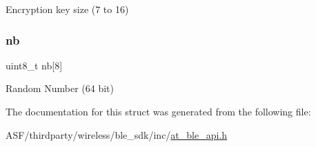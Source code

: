 Encryption key size (7 to 16) 

\mbox{\label{structat__ble___l_t_k__t_a3199b838db07457933ad33b42b04de39}} 
\subsubsection{\texorpdfstring{nb}{nb}}
{\footnotesize\ttfamily uint8\+\_\+t nb\mbox{[}8\mbox{]}}



Random Number (64 bit) 



The documentation for this struct was generated from the following file\+:\begin{DoxyCompactItemize}
\item 
A\+S\+F/thirdparty/wireless/ble\+\_\+sdk/inc/\mbox{\hyperlink{at__ble__api_8h}{at\+\_\+ble\+\_\+api.\+h}}\end{DoxyCompactItemize}
